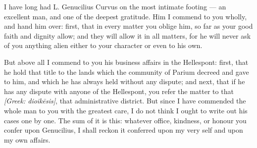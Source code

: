 

 I have long had L. Genucilius Curvus on the most intimate footing --- an excellent man, and one of the deepest gratitude. Him I commend to you wholly, and hand him over: first, that in every matter you oblige him, so far as your good faith and dignity allow; and they will allow it in all matters, for he will never ask of you anything alien either to your character or even to his own.

 But above all I commend to you his business affairs in the Hellespont: first, that he hold that title to the lands which the community of Parium decreed and gave to him, and which he has always held without any dispute; and next, that if he has any dispute with anyone of the Hellespont, you refer the matter to that \textit{[Greek: dioikēsis]}, that administrative district. But since I have commended the whole man to you with the greatest care, I do not think I ought to write out his cases one by one. The sum of it is this: whatever office, kindness, or honour you confer upon Genucilius, I shall reckon it conferred upon my very self and upon my own affairs.
